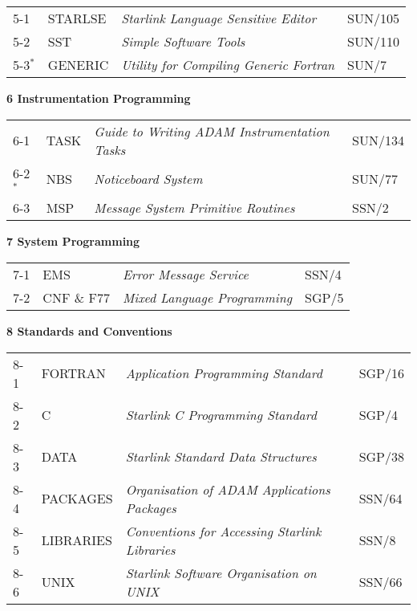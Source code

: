 \documentclass[twoside,11pt]{article}
\newcommand{\latex}[1]{#1}
\newcommand{\xref}[3]{#1}
\newcommand{\changed}{\bf $^*$}
\begin{document}
\begin{tabular}{p{8mm}p{27mm}p{90mm}l}
5-1 & STARLSE & {\em Starlink Language Sensitive Editor} & \xref{SUN/105}{sun105}{}\\
5-2 & SST & {\em Simple Software Tools} & \xref{SUN/110}{sun110}{}\\
5-3\changed & GENERIC & {\em Utility for Compiling Generic Fortran} & \xref{SUN/7}{sun7}{}\\
\end{tabular}

\latex{\vspace{2ex}}
{\Large \bf 6 Instrumentation Programming}

\begin{tabular}{p{8mm}p{27mm}p{90mm}l}
6-1 & TASK & {\em Guide to Writing ADAM Instrumentation Tasks} & \xref{SUN/134}{sun134}{}\\
6-2\changed & NBS & {\em Noticeboard System} & \xref{SUN/77}{sun77}{}\\
6-3 & MSP & {\em Message System Primitive Routines} & \xref{SSN/2}{ssn2}{}\\
\end{tabular}

\latex{\vspace{2ex}}
{\Large \bf 7 System Programming}

\begin{tabular}{p{8mm}p{27mm}p{90mm}l}
7-1 & EMS & {\em Error Message Service} & \xref{SSN/4}{ssn4}{}\\
7-2 & CNF \& F77 & {\em Mixed Language Programming} & \xref{SGP/5}{sgp5}{}\\
\end{tabular}

\latex{\vspace{2ex}}
{\Large \bf 8 Standards and Conventions}

\begin{tabular}{p{8mm}p{27mm}p{90mm}l}
8-1 & FORTRAN & {\em Application Programming Standard} & \xref{SGP/16}{sgp16}{}\\
8-2 & C & {\em Starlink C Programming Standard} & \xref{SGP/4}{sgp4}{}\\
8-3 & DATA & {\em Starlink Standard Data Structures} & \xref{SGP/38}{sgp38}{}\\
8-4 & PACKAGES & {\em Organisation of ADAM Applications Packages} & \xref{SSN/64}{ssn64}{}\\
8-5 & LIBRARIES & {\em Conventions for Accessing Starlink Libraries} & \xref{SSN/8}{ssn8}{}\\
8-6 & UNIX & {\em Starlink Software Organisation on UNIX} & \xref{SSN/66}{ssn66}{}\\
\end{tabular}
\end{document}
